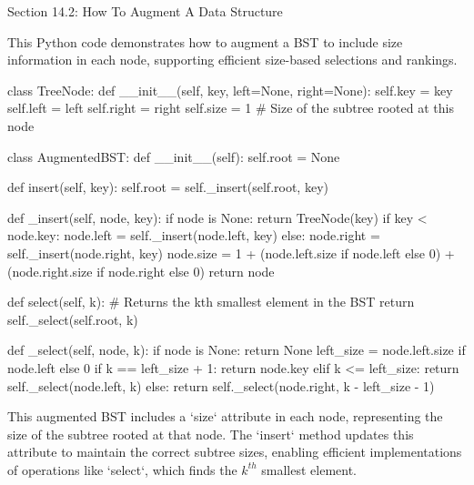 \begin{notes}{Section 14.2: How To Augment A Data Structure}
    \begin{highlight}
        This Python code demonstrates how to augment a BST to include size information in each node, supporting efficient size-based selections and rankings.
    \begin{code}[Python]
    class TreeNode:
        def __init__(self, key, left=None, right=None):
            self.key = key
            self.left = left
            self.right = right
            self.size = 1  # Size of the subtree rooted at this node
    
    class AugmentedBST:
        def __init__(self):
            self.root = None
    
        def insert(self, key):
            self.root = self._insert(self.root, key)
    
        def _insert(self, node, key):
            if node is None:
                return TreeNode(key)
            if key < node.key:
                node.left = self._insert(node.left, key)
            else:
                node.right = self._insert(node.right, key)
            node.size = 1 + (node.left.size if node.left else 0) + (node.right.size if node.right else 0)
            return node
    
        def select(self, k):
            # Returns the kth smallest element in the BST
            return self._select(self.root, k)
    
        def _select(self, node, k):
            if node is None:
                return None
            left_size = node.left.size if node.left else 0
            if k == left_size + 1:
                return node.key
            elif k <= left_size:
                return self._select(node.left, k)
            else:
                return self._select(node.right, k - left_size - 1)
    \end{code}
        This augmented BST includes a `size` attribute in each node, representing the size of the subtree rooted at that node. The `insert` method updates this attribute to maintain the correct subtree 
        sizes, enabling efficient implementations of operations like `select`, which finds the $k^{th}$ smallest element.
    \end{highlight}      
\end{notes}